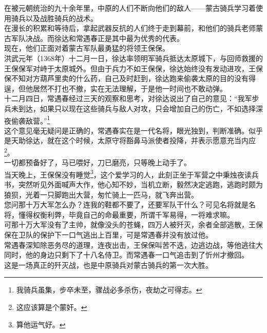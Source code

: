 \begin{multicols}{\theparacolNo}
在被元朝统治的九十余年里，中原的人们不断向他们的敌人——蒙古骑兵学习着使用骑兵以及战胜骑兵的战术。\\

在漫长的积累和等待后，拿起武器反抗的人们终于走到幕前，和他们的骑兵老师蒙古军队决战。而徐达和常遇春正是其中最为优秀的代表。\\

现在，他们正面对着蒙古军队最勇猛的将领王保保。\\

洪武元年（1368年）十二月一日，徐达率领明军骑兵抵达太原城下，与回师救援的王保保军对峙于太原城外。但由于兵力不如王保保，徐达始终没有发动进攻，王保保不知对方葫芦里卖的什么药，自己及时赶到，徐达跑来偷袭太原的目的没有得逞，但他居然不打也不撤，实在无法理解，于是他一时间也不敢动弹。\\

十二月四日，常遇春经过三天的观察和思考，对徐达说出了自己的意见：“我军步兵未到达，如果只以现在这些骑兵与敌人对攻，只会增加自己的伤亡，不如选择深夜偷袭敌营。”\footnote{我骑兵虽集，步卒未至，骤战必多杀伤，夜劫之可得志。}\\

这个意见毫无疑问是正确的，常遇春实在是一代名将，眼光独到，判断准确。似乎是天助徐达，就在这个时候，太原守将豁鼻马派使者投降，并表示愿意充当内应\footnote{这应该算是个蒙奸。}。\\

一切都预备好了，马已喂好，刀已磨亮，只等晚上动手了。\\

当天晚上，王保保没有睡觉\footnote{算他运气好。}，这个爱学习的人，此刻正坐于军营之中秉烛夜读兵书，突然听见外面喊声大作，他心知不妙，当机立断，毅然决定逃跑，逃跑时颇为狼狈，光着一只脚跑出大营，匆忙骑上一匹马，就飞奔出营。\\

您问那十万大军怎么办？连我的鞋都不要了，还要军队干什么？可见名将就是名将，懂得权衡利弊，毕竟自己的命最重要，所谓千军易得，一将难求嘛。\\

可那十万大军没有了主帅，就像没头的苍蝇，四万人被歼灭，余者全部逃散，王保保在卫队的保护下一口气逃出上百里，可是常遇春并没有放过他。\\

常遇春深知除恶务尽的道理，连夜出击，王保保叫苦不迭，边逃边战，等他逃往大同时，他的身边只剩下了十八名侍卫。而常遇春一口气追击到了忻州才撤回。\\

这是一场真正的歼灭战，也是中原骑兵对蒙古骑兵的第一次大胜。\\


\end{multicols}
